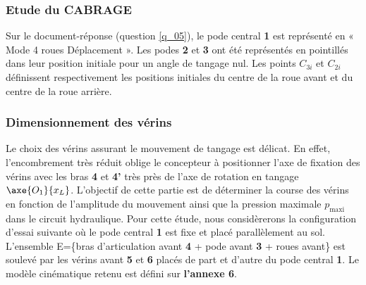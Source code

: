 \subsubsection{Etude du CABRAGE}
\ifprof
\else


Sur le document-réponse (question \ref{q_05}), le pode central \textbf{1} est représenté en « Mode 4 roues Déplacement ». Les podes \textbf{2} et \textbf{3} ont été représentés en pointillés dans leur position initiale pour un angle de tangage nul. Les points $C_{3i}$ et $C_{2i}$ définissent respectivement les positions initiales du centre de la roue avant et du centre de la roue arrière.
\fi

\ifprof
\begin{corrige}
\end{corrige}
\else
\fi


\subsubsection{Dimensionnement des vérins}
\ifprof
\else

Le choix des vérins assurant le mouvement de tangage est délicat. En effet, l’encombrement très réduit oblige le
concepteur à positionner l’axe de fixation des vérins avec les bras \textbf{4} et \textbf{4’} très près de l’axe de rotation en tangage $\axe{O_1}{x_L}$. L’objectif de cette partie est de déterminer la course des vérins en fonction de l’amplitude du mouvement ainsi que la pression maximale $p_{\text{maxi}}$ dans le circuit hydraulique. Pour cette étude, nous considèrerons la configuration d’essai suivante où le pode central \textbf{1} est fixe et placé parallèlement au sol. L’ensemble E=\{bras d’articulation avant \textbf{4} + pode avant \textbf{3} + roues avant\} est soulevé par les vérins avant \textbf{5} et \textbf{6} placés de part et d’autre du pode central \textbf{1}. Le modèle cinématique retenu est défini sur \textbf{l’annexe 6}.

